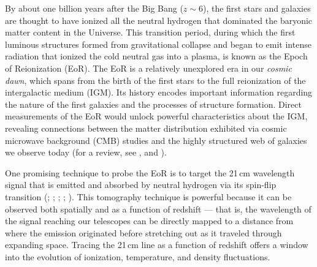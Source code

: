 \documentclass[preprint2,numberedappendix,tighten]{aastex6}  %
\begin{document}
By about one billion years after the Big Bang ($z \sim 6$), the first stars and galaxies are thought to have ionized all the 
neutral hydrogen that dominated the baryonic matter content in the Universe. This transition period, during which the first 
luminous structures formed from gravitational collapse and began to emit intense radiation that ionized the cold neutral gas 
into a plasma, is known as the Epoch of Reionization (EoR). The EoR is a relatively unexplored era in our \textit{cosmic dawn}, which spans from the birth of the first stars to the full reionization of the intergalactic medium (IGM). Its 
history encodes important information regarding the nature of the first galaxies and the processes of structure formation. 
Direct measurements of the EoR would unlock powerful characteristics about the IGM, revealing connections 
between the matter distribution exhibited via cosmic microwave background (CMB) studies and the highly structured 
web of galaxies we observe today (for a review, see \citet{barkana_and_loeb2001}, \citet{furlanetto_et_al2006} and \citet{loeb_furlanetto_2013}).

One promising technique to probe the EoR is to target the 21\,cm wavelength signal that is emitted and absorbed by neutral hydrogen via 
its spin-flip transition (\citealt{furlanetto_et_al2006}; \citealt{barkana_and_loeb2008}; \citealt{morales_and_wyithe2010}; \citealt{pritchard_and_loeb2010}; \citealt{pritchard_loeb2012}). This tomography technique is powerful because it can be observed both spatially and as a function of redshift --- that is, the wavelength 
of the signal reaching our telescopes can be directly mapped to a distance from where the emission originated before 
stretching out as it traveled through expanding space. Tracing the 21\,cm line as a function of redshift offers a window into the 
evolution of ionization, temperature, and density fluctuations.
\end{document}

